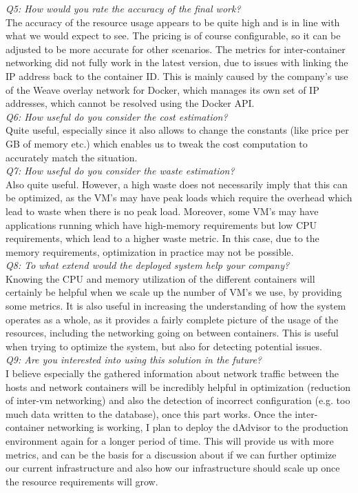 \noindent
\textit{Q5: How would you rate the accuracy of the final work?}\\
The accuracy of the resource usage appears to be quite high and is in line with what we would expect to see.
The pricing is of course configurable, so it can be adjusted to be more accurate for other scenarios.
The metrics for inter-container networking did not fully work in the latest version, due to issues with linking the IP address back to the container ID. This is mainly caused by the company's use of the Weave overlay network for Docker, which manages its own set of IP addresses, which cannot be resolved using the Docker API.\\

\noindent
\textit{Q6: How useful do you consider the cost estimation?}\\
Quite useful, especially since it also allows to change the constants (like price per GB of memory etc.) which enables us to tweak the cost computation to accurately match the situation.\\

\noindent
\textit{Q7: How useful do you consider the waste estimation?}\\
Also quite useful. However, a high waste does not necessarily imply that this can be optimized, as the VM's may have peak loads which require the overhead which lead to waste when there is no peak load.
Moreover, some VM's may have applications running which have high-memory requirements but low CPU requirements, which lead to a higher waste metric. In this case, due to the memory requirements, optimization in practice may not be possible.\\

\noindent
\textit{Q8: To what extend would the deployed system help your company?}\\
Knowing the CPU and memory utilization of the different containers will certainly be helpful when we scale up the number of VM's we use, by providing some metrics.
It is also useful in increasing the understanding of how the system operates as a whole, as it provides a fairly complete picture of the usage of the resources, including the networking going on between containers. This is useful when trying to optimize the system, but also for detecting potential issues.\\

\noindent
\textit{Q9: Are you interested into using this solution in the future?}\\	
I believe especially the gathered information about network traffic between the hosts and network containers will be incredibly helpful in optimization (reduction of inter-vm networking) and also the detection of incorrect configuration (e.g. too much data written to the database), once this part works.
Once the inter-container networking is working, I plan to deploy the dAdvisor to the production environment again for a longer period of time. This will provide us with more metrics, and can be the basis for a discussion about if we can further optimize our current infrastructure and also how our infrastructure should scale up once the resource requirements will grow.\\
